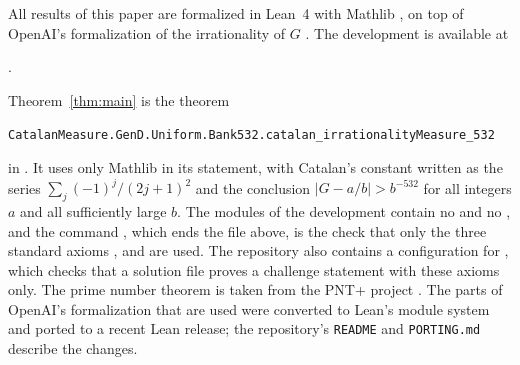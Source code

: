 All results of this paper are formalized in Lean~4 \cite{Lean4} with Mathlib \cite{Mathlib}, on top of
OpenAI's formalization of the irrationality of $G$ \cite{OpenAI2026}. The development is available at
\begin{center}
\FormalizationLink.
\end{center}
Theorem~\ref{thm:main} is the theorem
\begin{center}
{\small\texttt{CatalanMeasure.GenD.Uniform.Bank532.catalan\_irrationalityMeasure\_532}}
\end{center}
in . It uses only Mathlib in its statement, with
Catalan's constant written as the series $\sum_j(-1)^j/(2j+1)^2$ and the conclusion $|G-a/b|>b^{-532}$ for
all integers $a$ and all sufficiently large $b$. The modules of the development contain no  and no
, and the command , which ends the file above, is the check that
only the three standard axioms ,  and  are used. The
repository also contains a configuration  for 
\cite{Comparator}, which checks that a solution file proves a challenge statement with these axioms only. The prime number theorem is taken from the PNT+ project \cite{PNTPlus}. The parts of OpenAI's
formalization that are used were converted to Lean's module system and ported to a recent Lean release; the
repository's \texttt{README} and \texttt{PORTING.md} describe the changes.

